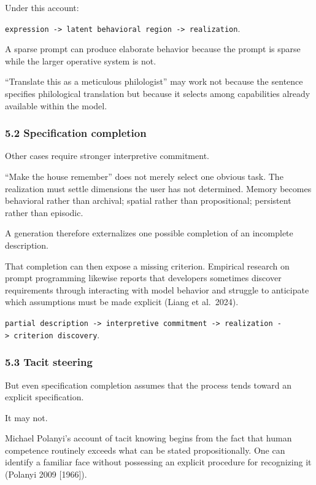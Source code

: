 \documentclass[
]{article}
\begin{document}
Under this account:

\texttt{expression\ -\textgreater{}\ latent\ behavioral\ region\ -\textgreater{}\ realization}.

A sparse prompt can produce elaborate behavior because the prompt is
sparse while the larger operative system is not.

``Translate this as a meticulous philologist'' may work not because the
sentence specifies philological translation but because it selects among
capabilities already available within the model.

\subsubsection{5.2 Specification
completion}\label{specification-completion}

Other cases require stronger interpretive commitment.

``Make the house remember'' does not merely select one obvious task. The
realization must settle dimensions the user has not determined. Memory
becomes behavioral rather than archival; spatial rather than
propositional; persistent rather than episodic.

A generation therefore externalizes one possible completion of an
incomplete description.

That completion can then expose a missing criterion. Empirical research
on prompt programming likewise reports that developers sometimes
discover requirements through interacting with model behavior and
struggle to anticipate which assumptions must be made explicit (Liang et
al.~2024).

\texttt{partial\ description\ -\textgreater{}\ interpretive\ commitment\ -\textgreater{}\ realization\ -\textgreater{}\ criterion\ discovery}.

\subsubsection{5.3 Tacit steering}\label{tacit-steering}

But even specification completion assumes that the process tends toward
an explicit specification.

It may not.

Michael Polanyi's account of tacit knowing begins from the fact that
human competence routinely exceeds what can be stated propositionally.
One can identify a familiar face without possessing an explicit
procedure for recognizing it (Polanyi 2009 {[}1966{]}).
\end{document}

